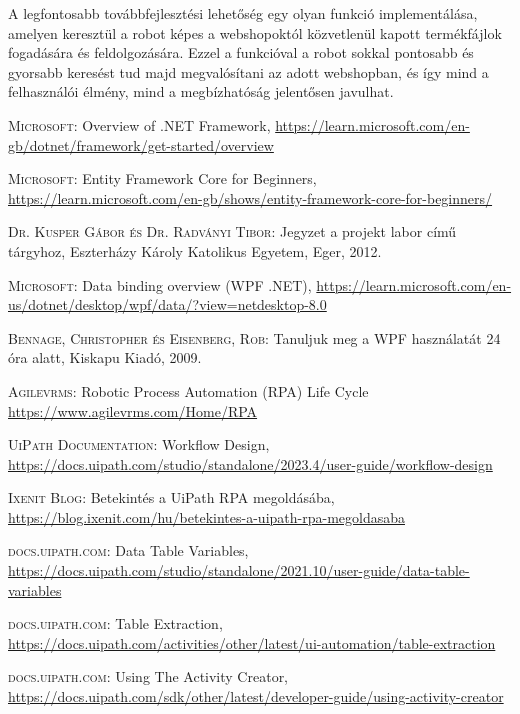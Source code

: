 \documentclass[
]{thesis-ekf}
\theoremstyle{definition}
\theoremstyle{remark}
\begin{document}
A legfontosabb továbbfejlesztési lehetőség egy olyan funkció implementálása, amelyen keresztül a robot képes a webshopoktól közvetlenül kapott termékfájlok fogadására és feldolgozására. Ezzel a funkcióval a robot sokkal pontosabb és gyorsabb keresést tud majd megvalósítani az adott webshopban, és így mind a felhasználói élmény, mind a megbízhatóság jelentősen javulhat.

\begin{thebibliography}{2}
\textsc{Microsoft}: Overview of .NET Framework, 
\url{https://learn.microsoft.com/en-gb/dotnet/framework/get-started/overview}

\textsc{Microsoft}: Entity Framework Core for Beginners, 
\url{https://learn.microsoft.com/en-gb/shows/entity-framework-core-for-beginners/}

\textsc{Dr. Kusper Gábor és Dr. Radványi Tibor}: Jegyzet a projekt labor című tárgyhoz, Eszterházy Károly Katolikus Egyetem, Eger, 2012.

\textsc{Microsoft}: Data binding overview (WPF .NET), 
\url{https://learn.microsoft.com/en-us/dotnet/desktop/wpf/data/?view=netdesktop-8.0}

\textsc{Bennage, Christopher és Eisenberg, Rob}: Tanuljuk meg a WPF használatát 24 óra alatt, Kiskapu Kiadó, 2009.

\textsc{Agilevrms}: Robotic Process Automation (RPA) Life Cycle
\url{https://www.agilevrms.com/Home/RPA}

\textsc{UiPath Documentation}: Workflow Design, 
\url{https://docs.uipath.com/studio/standalone/2023.4/user-guide/workflow-design}

\textsc{Ixenit Blog}: Betekintés a UiPath RPA megoldásába, 
\url{https://blog.ixenit.com/hu/betekintes-a-uipath-rpa-megoldasaba}

\textsc{docs.uipath.com}: Data Table Variables, 
\url{https://docs.uipath.com/studio/standalone/2021.10/user-guide/data-table-variables}

\textsc{docs.uipath.com}: Table Extraction, 
\url{https://docs.uipath.com/activities/other/latest/ui-automation/table-extraction}

\textsc{docs.uipath.com}: Using The Activity Creator, 
\url{https://docs.uipath.com/sdk/other/latest/developer-guide/using-activity-creator}
\end{thebibliography}


\end{document}
